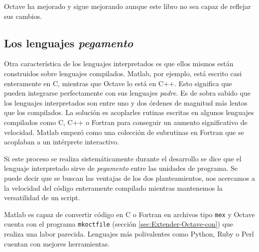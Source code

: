 Octave ha mejorado y sigue mejorando aunque este libro no sea capaz de
reflejar sus cambios.

\subsection{Los lenguajes \emph{pegamento}}

Otra característica de los lenguajes interpretados es que ellos mismos
están construidos sobre lenguajes compilados. Matlab, por ejemplo,
está escrito casi enteramente en C, mientras que Octave lo está en
C++. Esto significa que pueden integrarse perfectamente con sus
lenguajes \emph{padre}. Es de sobra sabido que los lenguajes
interpretados son entre uno y dos órdenes de magnitud más lentos que
los compilados.  La solución es acoplarles rutinas escritas en algunos
lenguajes compilados como C, C++ o Fortran para conseguir un aumento
significativo de velocidad.  Matlab empezó como una colección de
subrutinas en Fortran que se acoplaban a un intérprete interactivo.

Si este proceso se realiza sistemáticamente durante el desarrollo se
dice que el lenguaje interpretado sirve de \emph{pegamento} entre las
unidades de programa. Se puede decir que se buscan las ventajas de los
dos planteamientos, nos acercamos a la velocidad del código
enteramente compilado mientras mantenemos la versatilidad de un
script.

Matlab es capaz de convertir código en C o Fortran en archivos tipo
\texttt{mex} y Octave cuenta con el programa \texttt{mkoctfile}
(sección \ref{sec:Extender-Octave-con}) que realiza una labor
parecida. Lenguajes más polivalentes como Python, Ruby o
Perl cuentan con mejores herramientas.
